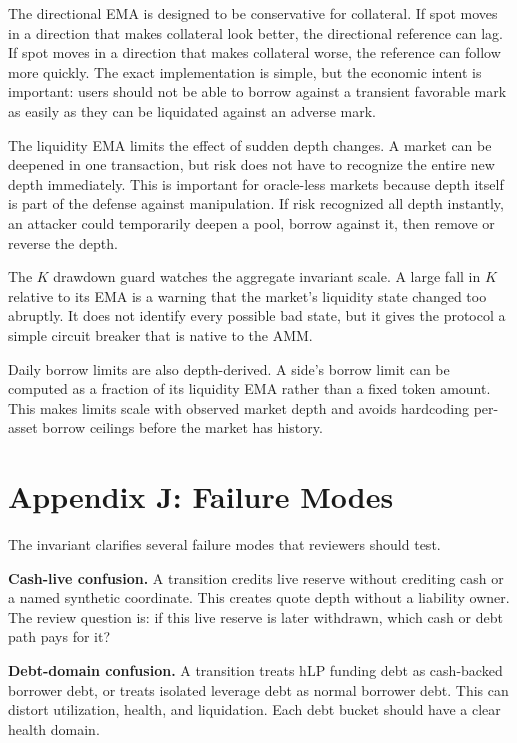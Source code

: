 \documentclass[11pt]{article}
\begin{document}
The directional EMA is designed to be conservative for collateral. If spot moves in a direction that makes collateral look better, the directional reference can lag. If spot moves in a direction that makes collateral worse, the reference can follow more quickly. The exact implementation is simple, but the economic intent is important: users should not be able to borrow against a transient favorable mark as easily as they can be liquidated against an adverse mark.

The liquidity EMA limits the effect of sudden depth changes. A market can be deepened in one transaction, but risk does not have to recognize the entire new depth immediately. This is important for oracle-less markets because depth itself is part of the defense against manipulation. If risk recognized all depth instantly, an attacker could temporarily deepen a pool, borrow against it, then remove or reverse the depth.

The $K$ drawdown guard watches the aggregate invariant scale. A large fall in $K$ relative to its EMA is a warning that the market's liquidity state changed too abruptly. It does not identify every possible bad state, but it gives the protocol a simple circuit breaker that is native to the AMM.

Daily borrow limits are also depth-derived. A side's borrow limit can be computed as a fraction of its liquidity EMA rather than a fixed token amount. This makes limits scale with observed market depth and avoids hardcoding per-asset borrow ceilings before the market has history.

\section{Appendix J: Failure Modes}

The invariant clarifies several failure modes that reviewers should test.

\textbf{Cash-live confusion.} A transition credits live reserve without crediting cash or a named synthetic coordinate. This creates quote depth without a liability owner. The review question is: if this live reserve is later withdrawn, which cash or debt path pays for it?

\textbf{Debt-domain confusion.} A transition treats hLP funding debt as cash-backed borrower debt, or treats isolated leverage debt as normal borrower debt. This can distort utilization, health, and liquidation. Each debt bucket should have a clear health domain.
\end{document}

